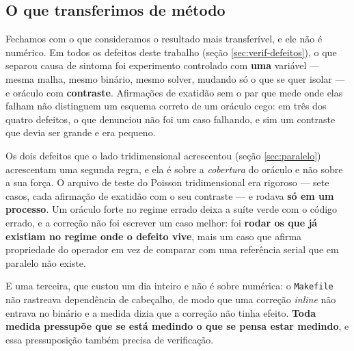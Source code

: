\subsection{O que transferimos de método}

Fechamos com o que consideramos o resultado mais transferível, e ele não é
numérico. Em todos os defeitos deste trabalho (seção \ref{sec:verif-defeitos}), o
que separou causa de sintoma foi experimento controlado com \textbf{uma} variável
--- mesma malha, mesmo binário, mesmo solver, mudando só o que se quer isolar ---
e oráculo com \textbf{contraste}. Afirmações de exatidão sem o par que mede onde
elas falham não distinguem um esquema correto de um oráculo cego: em três dos
quatro defeitos, o que denunciou não foi um caso falhando, e sim um contraste que
devia ser grande e era pequeno.

Os dois defeitos que o lado tridimensional acrescentou (seção
\ref{sec:paralelo}) acrescentam uma segunda regra, e ela é sobre a
\emph{cobertura} do oráculo e não sobre a sua força. O arquivo de teste do
Poisson tridimensional era rigoroso --- sete casos, cada afirmação de exatidão
com o seu contraste --- e rodava \textbf{só em um processo}. Um oráculo forte no
regime errado deixa a suíte verde com o código errado, e a correção não foi
escrever um caso melhor: foi \textbf{rodar os que já existiam no regime onde o
defeito vive}, mais um caso que afirma propriedade do operador em vez de
comparar com uma referência serial que em paralelo não existe.

E uma terceira, que custou um dia inteiro e não é sobre numérica: o
\texttt{Makefile} não rastreava dependência de cabeçalho, de modo que uma
correção \emph{inline} não entrava no binário e a medida dizia que a correção
não tinha efeito. \textbf{Toda medida pressupõe que se está medindo o que se
pensa estar medindo}, e essa pressuposição também precisa de verificação.
